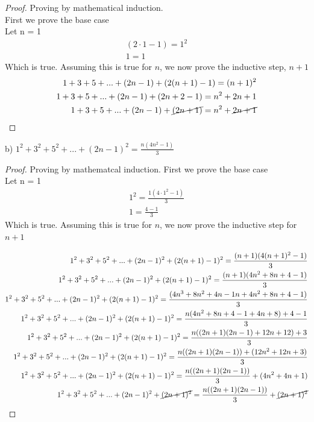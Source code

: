 \documentclass[]{report}
\begin{document}
\begin{proof}
	Proving by mathematical induction.\\
	First we prove the base case\\
	Let n = 1\\
	\begin{align*}
		(2\cdot 1 - 1) = 1^2 \\
		1 = 1
	\end{align*}	
	Which is true. Assuming this is true for $n$, we now prove the inductive step, $n+1$
	\begin{align*}
	1 + 3 + 5 + ... + (2n-1)  + (2(n+1) - 1) = (n + 1)^2\\
	1 + 3 + 5 + ... + (2n-1)  + (2n + 2 - 1) = n^2 + 2n + 1 \\
	1 + 3 + 5 + ... + (2n-1)  + \cancel{(2n + 1)} = n^2 + \cancel{2n + 1}
	\end{align*}
\end{proof}

b) $1^2 + 3^2 + 5^2 + ...  +(2n - 1)^2 = \frac{n(4n^2 -1)}{3}$

\begin{proof}
	Proving by mathematcal induction.
	First we prove the base case\\
	Let n = 1
	\begin{align*}
		1^2 = \frac{1(4\cdot 1^2 - 1)}{3} \\
		1 = \frac{4 -1}{3}
	\end{align*}
	Which is true. Assuming this is true for $n$, we now prove the inductive step for $n+1$
	
	\begin{align*}
		1^2 + 3^2 + 5^2 + ...  +(2n - 1)^2 +(2(n+1) - 1)^2 = \frac{(n+1)(4(n+1)^2 -1)}{3}\\
		1^2 + 3^2 + 5^2 + ...  +(2n - 1)^2 +(2(n+1) - 1)^2 = \frac{(n+1)(4n^2 + 8n + 4 -1)}{3}\\
		1^2 + 3^2 + 5^2 + ...  +(2n - 1)^2 +(2(n+1) - 1)^2 = \frac{(4n^3 + 8n^2 + 4n -1n + 4n^2 + 8n + 4 - 1)}{3}\\
		1^2 + 3^2 + 5^2 + ...  +(2n - 1)^2 +(2(n+1) - 1)^2 = \frac{n(4n^2 + 8n + 4 -1 + 4n + 8) + 4 - 1}{3}\\
		1^2 + 3^2 + 5^2 + ...  +(2n - 1)^2 +(2(n+1) - 1)^2 = \frac{n((2n+1)(2n-1) + 12n + 12) + 3}{3}\\
		1^2 + 3^2 + 5^2 + ...  +(2n - 1)^2 +(2(n+1) - 1)^2 = \frac{n((2n+1)(2n-1)) + (12n^2 + 12n + 3)}{3}\\
		1^2 + 3^2 + 5^2 + ...  +(2n - 1)^2 +(2(n+1) - 1)^2 = \frac{n((2n+1)(2n-1))}{3} + (4n^2 + 4n + 1)\\
		1^2 + 3^2 + 5^2 + ...  +(2n - 1)^2 +\cancel{(2n+1)^2} = \frac{n((2n+1)(2n-1))}{3} + \cancel{(2n + 1)^2}\\
	\end{align*}
\end{proof}
\end{document}
